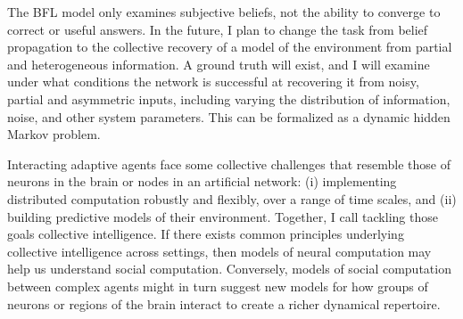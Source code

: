 \documentclass[]{article}
\begin{document}
The BFL model only examines subjective beliefs, not the ability to converge to correct or useful answers. In the future, I plan to change the task from belief propagation to the collective recovery of a model of the environment from partial and heterogeneous information. A ground truth will exist, and I will examine under what conditions the network is successful at recovering it from noisy, partial and asymmetric inputs, including varying the distribution of information, noise, and other system parameters. This can be formalized as a dynamic hidden Markov problem.

Interacting adaptive agents face some collective challenges that resemble those of neurons in the brain or nodes in an artificial network: (i) implementing distributed computation robustly and flexibly, over a range of time scales, and (ii) building predictive models of their environment. Together, I call tackling those goals collective intelligence. If there exists common principles underlying collective intelligence across settings, then models of neural computation may help us understand social computation. Conversely, models of social computation between complex agents might in turn suggest new models for how groups of neurons or regions of the brain interact to create a richer dynamical repertoire.

\printbibliography[heading=bibintoc, title={References}]
\end{document}
